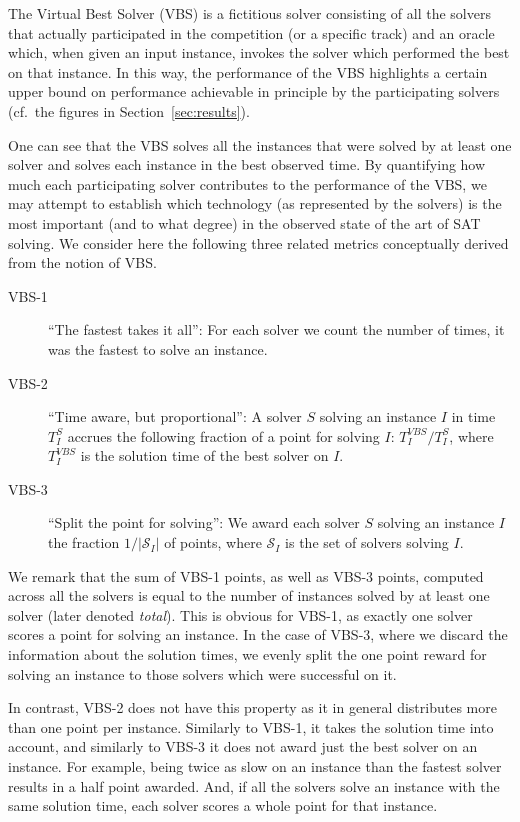 \documentclass{elsarticle}
\begin{document}
\label{subsec:vbs_explained}

The Virtual Best Solver (VBS) is a fictitious solver consisting 
of all the solvers that actually participated in the competition (or a specific track)
and an oracle which, when given an input instance,
invokes  the  solver which performed the best on that instance.
In this way, the performance of the VBS highlights a certain upper bound 
on performance achievable in principle by the 
 participating solvers (cf.~the figures in Section~\ref{sec:results}). 

One can see that the VBS solves all the instances that
were solved by at least one solver and solves each instance in the best observed time.
By quantifying how much each participating solver contributes
to the performance of the VBS, we may attempt to establish which
technology (as represented by the solvers) is the most important
(and to what degree) in the observed state of the art of SAT solving.
We consider here the following three related metrics conceptually derived
from the notion of VBS.

\begin{description}
\item[VBS-1]
``The fastest takes it all'':
For each solver we count the number of times, it was the fastest to solve an instance.
\item[VBS-2]
``Time aware, but proportional'':
A solver $S$ solving an instance $I$ in time $T^S_I$ accrues 
the following fraction of a point for solving $I$:
$T^\mathit{VBS}_I/T^S_I$, where $T^\mathit{VBS}_I$ is the solution time of the best solver on $I$.
\item[VBS-3]
``Split the point for solving'':
We award each solver $S$ solving an instance $I$ the fraction $1/|\mathcal{S}_I|$ of points, where
$\mathcal{S}_I$ is the set of solvers solving $I$.
\end{description}

We remark that the sum of VBS-1 points, as well as VBS-3 points, computed across all the solvers
is equal to the number of instances solved by at least one solver (later denoted \emph{total}).
This is obvious for VBS-1, as exactly one solver scores a point for solving an instance.
In the case of VBS-3, where we discard the information about the solution times, 
we evenly split the one point reward for solving an instance to those solvers which were successful on it.

In contrast, VBS-2 does not have this property as it in general distributes more than one point per instance.
Similarly to VBS-1, it takes the solution time into account,
and similarly to VBS-3 it does not award just the best solver on an instance.
For example, being twice as slow on an instance than the fastest solver results in a half point awarded.
And, if all the solvers solve an instance with the same solution time,
each solver scores a whole point for that instance. 
\end{document}
